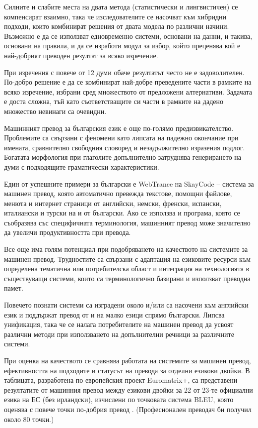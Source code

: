 \begin{multicols}{2}
Силните и слабите места на двата метода (статистически и лингвистичен) се компенсират взаимно, така че изследователите се насочват към
 хибридни подходи, които комбинират решения от двата модела по различни начини. Възможно е да се използват едновременно системи, основани на данни, и
 такива, основани на правила, и да се изработи модул за избор, който преценява кой е най-добрият преводен резултат за всяко изречение. 

При изречения с повече от 12 думи обаче резултатът често не е задоволителен. По-добро решение е да се комбинират най-добре преведените части в рамките на всяко изречение, избрани сред множеството от предложени алтернативи. 
Задачата е доста сложна, тъй като съответстващите си части в рамките на дадено множество невинаги са очевидни.

Машинният превод за българския език е още по-голямо предизвикателство. Проблемите са свързани с феномени като липсата на падежно окончание при имената, сравнително свободния словоред и незадължително изразения подлог. Богатата морфология при глаголите допълнително затруднява генерирането на думи с подходящите граматически характеристики.

Един от успешните примери за български е WebTrance на SkayCode – система за машинен превод, която автоматично превежда текстове, помощни файлове, менюта и интернет страници от английски, немски, френски, испански, италиански и турски на и от български. Ако се използва и програма, която се съобразява със специфичната терминология, машинният превод може значително да увеличи продуктивността при превода.

Все  още има голям потенциал при подобряването на качеството на системите за машинен превод. Трудностите са свързани с адаптация на езиковите ресурси към определена тематична или потребителска област и интеграция на технологията в
 съществуващи системи, които са терминологично базирани и използват преводна памет. 

Повечето познати системи са изградени около и/или са насочени към английски език и поддържат превод от и на малко езици спрямо български. Липсва унификация, така че се налага потребителите на машинен превод да усвоят
 различни методи при използването на допълнителни речници за различните системи.

При оценка на качеството се сравнява работата на системите за
 машинен превод, ефективността на подходите и статусът на превода за отделни
 езикови двойки. В таблицата, разработена по европейския проект
 Euromatrix+, са представени резултатите от машинния
 превод между езикови двойки за 22 от 23-те официални езика на ЕС
 (без ирландски), изчислени по точковата система BLEU, която оценява с повече точки по-добрия превод \cite{bleu1}. (Професионален преводач би получил около 80 точки.)


\end{multicols}
